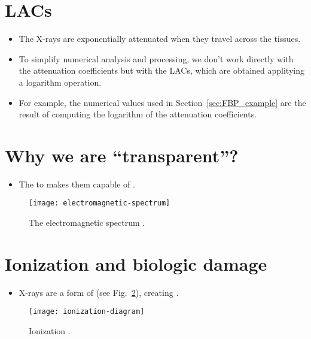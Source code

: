 \section{\glspl{LAC}}
\begin{itemize}
\item The X-rays are
  exponentially attenuated when they travel across the tissues.
\item To simplify numerical analysis and processing, we don't work
  directly with the attenuation coefficients but with the \glspl{LAC}, which
  are obtained applitying a logarithm operation.
\item For example, the numerical values used in
  Section~\ref{sec:FBP_example} are the result of computing the
  logarithm of the 
  attenuation coefficients.
\end{itemize}

\section{Why we are ``transparent''?}
\begin{itemize}
\item The  to  makes them capable of .
\end{itemize}
\vspace{-4ex}
\begin{figure}[!h]
  \centering
  \texttt{[image: electromagnetic-spectrum]}
  \caption{The electromagnetic spectrum
    \cite{X-rays_in_spectrum}.\label{fig:X-rays_in_spectrum}}
\end{figure}

\section{Ionization and biologic damage}
\begin{itemize}
\item X-rays are a form of  (see Fig.~\ref{fig:ionization}), creating
  .
\end{itemize}
\vspace{-3ex}
\begin{figure}[!h]
  \centering
  \texttt{[image: ionization-diagram]}
  \caption{Ionization
    \cite{Perakende_ionization}.\label{fig:ionization}}
\end{figure}


